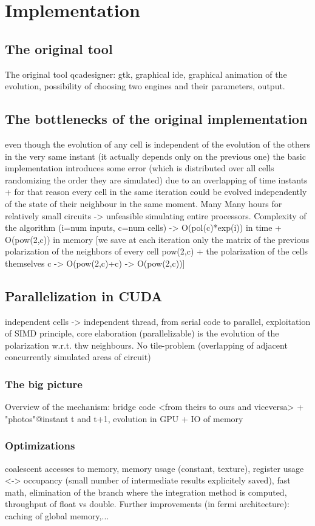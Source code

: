 \section{Implementation}\label{sec:i}
\subsection {The original tool}
The original tool
qcadesigner: gtk, graphical ide, graphical animation of the evolution, possibility of choosing two engines and their parameters, output.
\subsection {The bottlenecks of the original implementation}
even though the evolution of any cell is independent of the evolution of the others  in the very same instant  (it actually depends only on the previous one) the basic implementation introduces some error (which is distributed over all cells randomizing the order they are simulated) due to an overlapping of time instants + for that reason every cell in the same iteration could be evolved  independently  of the state of their neighbour in the same moment. Many Many hours for relatively small circuits -> unfeasible simulating entire processors. Complexity of the algorithm (i=num inputs, c=num cells) -> O(pol(c)*exp(i)) in time + O(pow(2,c)) in memory [we save at each iteration only the matrix of the previous polarization of the neighbors of every cell {pow(2,c)} + the polarization of the cells themselves {c} -> O(pow(2,c)+c) -> O(pow(2,c))]
\subsection {Parallelization in CUDA}
independent cells -> independent thread, from serial code to parallel, exploitation of SIMD principle, core elaboration (parallelizable) is the evolution of the polarization w.r.t. thw neighbours. No tile-problem (overlapping of adjacent concurrently simulated areas of circuit)
\subsubsection{The big picture}
Overview of the mechanism: bridge code <from theirs to ours and viceversa> + "photos"@instant t and t+1, evolution in GPU + IO of memory
\subsubsection{Optimizations}
coalescent accesses to memory, memory usage (constant, texture), register usage <-> occupancy (small number of intermediate results explicitely saved), fast math, elimination of the branch where the integration method is computed, throughput of float vs double. Further improvements (in fermi architecture): caching of global memory,...
